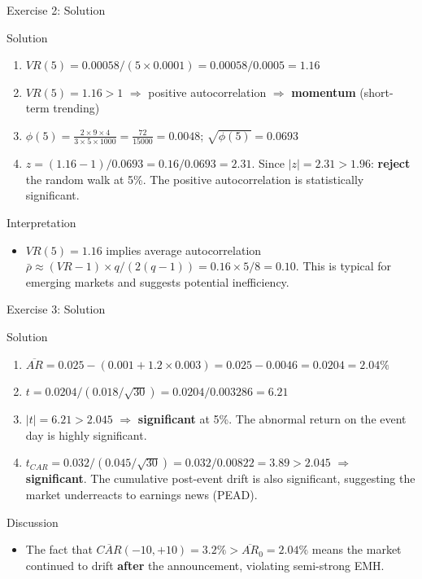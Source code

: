 \documentclass[9pt, aspectratio=169, t]{beamer}
\theoremstyle{definition}
\begin{document}
\begin{frame}{Exercise 2: Solution}
\begin{block}{Solution}
\begin{enumerate}
\item $VR(5) = 0.00058 / (5 \times 0.0001) = 0.00058 / 0.0005 = 1.16$
\item $VR(5) = 1.16 > 1$ $\Rightarrow$ positive autocorrelation $\Rightarrow$ \textbf{momentum} (short-term trending)
\item $\phi(5) = \frac{2 \times 9 \times 4}{3 \times 5 \times 1000} = \frac{72}{15000} = 0.0048$; \quad $\sqrt{\phi(5)} = 0.0693$
\item $z = (1.16 - 1)/0.0693 = 0.16/0.0693 = 2.31$. Since $|z| = 2.31 > 1.96$: \textbf{reject} the random walk at 5\%. The positive autocorrelation is statistically significant.
\end{enumerate}
\end{block}
\vspace{0.1cm}
\begin{alertblock}{Interpretation}
\begin{itemize}\setlength{\itemsep}{0pt}
    \item $VR(5) = 1.16$ implies average autocorrelation $\bar{\rho} \approx (VR - 1) \times q/(2(q-1)) = 0.16 \times 5/8 = 0.10$. This is typical for emerging markets and suggests potential inefficiency.
\end{itemize}
\end{alertblock}
\end{frame}

\begin{frame}{Exercise 3: Solution}
\begin{block}{Solution}
\begin{enumerate}
\item $\overline{AR} = 0.025 - (0.001 + 1.2 \times 0.003) = 0.025 - 0.0046 = 0.0204 = 2.04\%$
\item $t = 0.0204 / (0.018/\sqrt{30}) = 0.0204 / 0.003286 = 6.21$
\item $|t| = 6.21 > 2.045$ $\Rightarrow$ \textbf{significant} at 5\%. The abnormal return on the event day is highly significant.
\item $t_{CAR} = 0.032 / (0.045/\sqrt{30}) = 0.032/0.00822 = 3.89 > 2.045$ $\Rightarrow$ \textbf{significant}. The cumulative post-event drift is also significant, suggesting the market underreacts to earnings news (PEAD).
\end{enumerate}
\end{block}
\vspace{0.1cm}
\begin{exampleblock}{Discussion}
\begin{itemize}\setlength{\itemsep}{0pt}
    \item The fact that $\overline{CAR}(-10,+10) = 3.2\% > \overline{AR}_0 = 2.04\%$ means the market continued to drift \textbf{after} the announcement, violating semi-strong EMH.
\end{itemize}
\end{exampleblock}
\end{frame}
\end{document}

